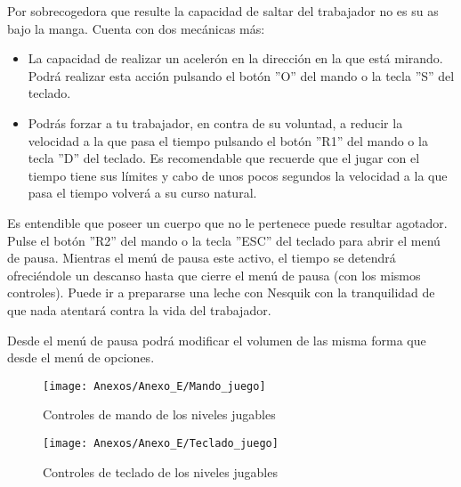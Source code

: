 Por sobrecogedora que resulte la capacidad de saltar del \textcolor{azulWorker}{trabajador} no es su as bajo la manga. Cuenta con dos mecánicas más:
\begin{itemize}
\item
La capacidad de realizar un acelerón en la dirección en la que está mirando. Podrá realizar esta acción pulsando el botón ''O'' del mando o la tecla ''S'' del teclado.
\item
Podrás forzar a tu \textcolor{azulWorker}{trabajador}, en contra de su voluntad, a reducir la velocidad a la que pasa el tiempo pulsando el botón ''R1'' del mando o la tecla ''D'' del teclado. Es recomendable que recuerde que el jugar con el tiempo tiene sus límites y cabo de unos pocos segundos la velocidad a la que pasa el tiempo volverá a su curso natural.
\end{itemize}


Es entendible que poseer un cuerpo que no le pertenece puede resultar agotador. Pulse el botón ''R2'' del mando o la tecla ''ESC'' del teclado para abrir el menú de pausa. Mientras el menú de pausa este activo, el tiempo se detendrá ofreciéndole un descanso hasta que cierre el menú de pausa (con los mismos controles). Puede ir a prepararse una leche con Nesquik con la tranquilidad de que nada atentará contra la vida del \textcolor{azulWorker}{trabajador}.

Desde el menú de pausa podrá modificar el volumen de las misma forma que desde el menú de opciones.

\begin{figure}[h]
\centering
\texttt{[image: Anexos/Anexo\_E/Mando\_juego]}
\caption{Controles de mando de los niveles jugables}
\end{figure}

\begin{figure}[h]
\centering
\texttt{[image: Anexos/Anexo\_E/Teclado\_juego]}
\caption{Controles de teclado de los niveles jugables}
\end{figure}